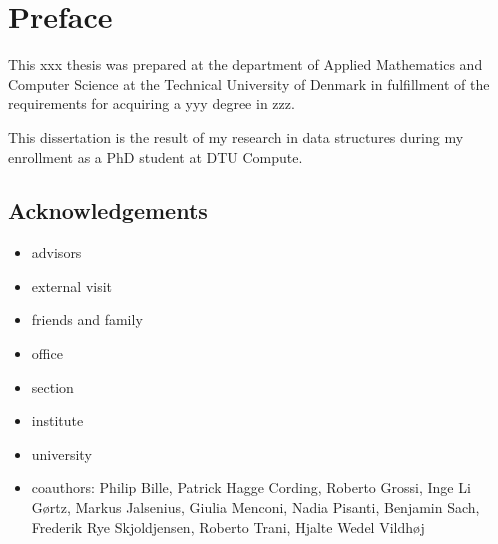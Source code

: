 \chapter{Preface}
This xxx thesis was prepared at the department of Applied Mathematics and Computer Science at the Technical University of Denmark in fulfillment of the requirements for acquiring a yyy degree in zzz. 

This dissertation is the result of my research in data structures during my enrollment as a PhD student at DTU Compute.




\section{Acknowledgements}

\begin{itemize}
    \item advisors
    \item external visit
    \item friends and family
    \item office
    \item section
    \item institute
    \item university
    \item coauthors: Philip Bille, Patrick Hagge Cording, Roberto Grossi, Inge Li Gørtz, Markus Jalsenius, Giulia Menconi, Nadia Pisanti, Benjamin Sach, Frederik Rye Skjoldjensen, Roberto Trani, Hjalte Wedel Vildhøj
\end{itemize}

 

